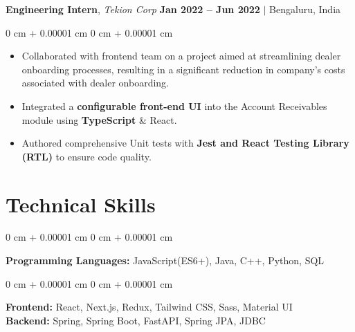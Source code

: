 \documentclass[10pt, letterpaper]{article}
\newenvironment{highlights}{
    \begin{itemize}[
        topsep=0.10 cm,     %
        parsep=0.10 cm,     %
        partopsep=0pt,      %
        itemsep=0pt,        %
        leftmargin=0 cm + 10pt  %
    ]
}{
    \end{itemize}
}
\newenvironment{onecolentry}{
    \begin{adjustwidth}{
        0 cm + 0.00001 cm
    }{
        0 cm + 0.00001 cm
    }
}{
    \end{adjustwidth}
}
\begin{document}
        \vspace{0.3 cm}

        \noindent
        \textbf{Engineering Intern}, {\color{darkgray}\textit{Tekion Corp}} \hfill {\color{darkgray}\small{ \textbf{Jan 2022 – Jun 2022} $|$ Bengaluru, India }}

        \vspace{0.10 cm}
        \begin{onecolentry}
            \begin{highlights}
                \item Collaborated with frontend team on a project aimed at streamlining dealer onboarding processes, resulting in a significant reduction in company's costs associated with dealer onboarding.
                \item Integrated a \textbf{configurable front-end UI} into the Account Receivables module using \textbf{TypeScript} \& React.
                \item Authored comprehensive Unit tests with \textbf{Jest and React Testing Library (RTL)} to ensure code quality.
            \end{highlights}
        \end{onecolentry}


    
    \section{Technical Skills}

        \begin{onecolentry}
        \textbf{Programming Languages:} JavaScript(ES6+), Java, C++, Python, SQL  %
        \end{onecolentry}
        
        \vspace{0.1 cm}
        
        \begin{onecolentry}
        \textbf{Frontend:} React, Next.js, Redux, Tailwind CSS, Sass, Material UI \\  %
        \vspace{0.1 cm}
        \textbf{Backend:} Spring, Spring Boot, FastAPI, Spring JPA, JDBC  %
        \end{onecolentry}
        
\end{document}
